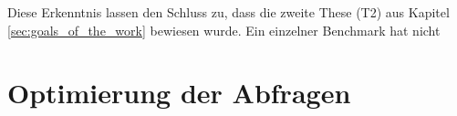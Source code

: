 Diese Erkenntnis lassen den Schluss zu, dass die zweite These (T2) aus Kapitel \ref{sec:goals_of_the_work} bewiesen wurde. Ein einzelner Benchmark hat nicht \vspace{0.2cm}


\section{Optimierung der Abfragen}






